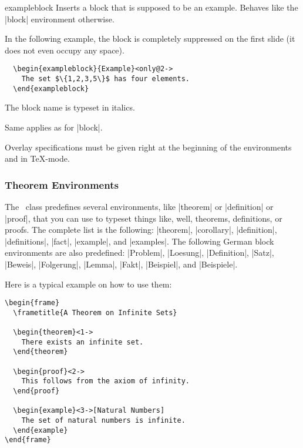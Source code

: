 \begin{environment}{{exampleblock}} 
  Inserts a block that is supposed to be an example. Behaves like the
  |block| environment otherwise.
  
  \example In the following example, the block is completely
  suppressed on the first slide (it does not even occupy any space).
\begin{verbatim}
  \begin{exampleblock}{Example}<only@2->
    The set $\{1,2,3,5\}$ has four elements.
  \end{exampleblock}
\end{verbatim}

  \articlenote
  The block name is typeset in italics.

  \lyxnote
  Same applies as for |block|.
\end{environment}

\lyxnote
Overlay specifications must be given right at the beginning of the
environments and in \TeX-mode.



\subsubsection{Theorem Environments}
\label{section-theorems}

The \beamer\ class predefines several environments, like |theorem| or
|definition| or |proof|, that you can use to typeset things like,
well, theorems, definitions, or proofs. The complete list is the
following:  |theorem|, |corollary|, |definition|,
|definitions|, |fact|, |example|, and |examples|. The following German
block environments are also predefined: |Problem|, |Loesung|,
|Definition|, |Satz|, |Beweis|, |Folgerung|, |Lemma|, |Fakt|,
|Beispiel|, and |Beispiele|.

Here is a typical example on how to use them:

\begin{verbatim}
\begin{frame}
  \frametitle{A Theorem on Infinite Sets}

  \begin{theorem}<1->
    There exists an infinite set.
  \end{theorem}

  \begin{proof}<2->
    This follows from the axiom of infinity.
  \end{proof}

  \begin{example}<3->[Natural Numbers]
    The set of natural numbers is infinite.
  \end{example}
\end{frame}
\end{verbatim}

